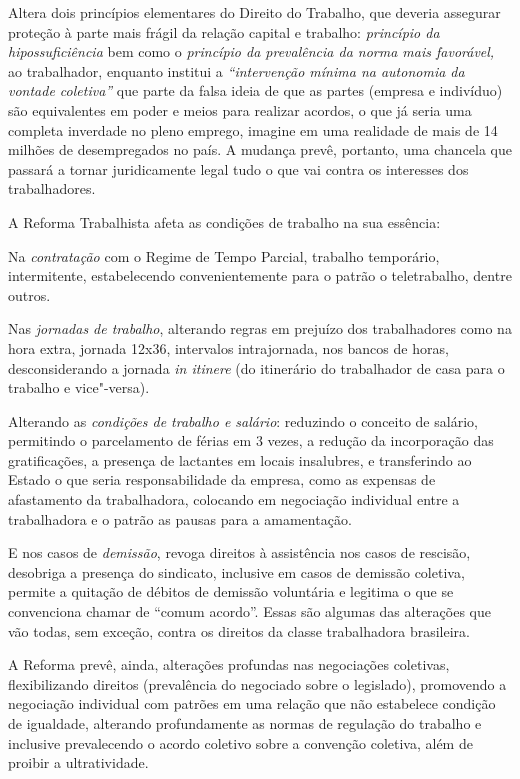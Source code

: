 Altera dois princípios elementares do Direito do Trabalho, que deveria
assegurar proteção à parte mais frágil da relação capital e trabalho:
\emph{princípio da hipossuficiência} bem como o \emph{princípio da
prevalência da norma mais favorável,} ao trabalhador, enquanto institui
a \emph{``intervenção mínima na autonomia da vontade coletiva''} que
parte da falsa ideia de que as partes (empresa e indivíduo) são
equivalentes em poder e meios para realizar acordos, o que já seria uma
completa inverdade no pleno emprego, imagine em uma realidade de mais de
14 milhões de desempregados no país. A mudança prevê, portanto, uma
chancela que passará a tornar juridicamente legal tudo o que vai contra
os interesses dos trabalhadores.

A Reforma Trabalhista afeta as condições de trabalho na sua essência:

Na \emph{contratação} com o Regime de Tempo Parcial, trabalho
temporário, intermitente, estabelecendo convenientemente para o patrão o
teletrabalho, dentre outros.

Nas \emph{jornadas de trabalho}, alterando regras em prejuízo dos
trabalhadores como na hora extra, jornada 12x36, intervalos
intrajornada, nos bancos de horas, desconsiderando a jornada \emph{in
itinere} (do itinerário do trabalhador de casa para o trabalho e
vice"-versa).

Alterando as \emph{condições de trabalho e salário}: reduzindo o
conceito de salário, permitindo o parcelamento de férias em 3 vezes, a
redução da incorporação das gratificações, a presença de lactantes em
locais insalubres, e transferindo ao Estado o que seria responsabilidade
da empresa, como as expensas de afastamento da trabalhadora, colocando em
negociação individual entre a trabalhadora e o patrão as pausas para a
amamentação.

E nos casos de \emph{demissão}, revoga direitos à assistência nos casos
de rescisão, desobriga a presença do sindicato, inclusive em casos de
demissão coletiva, permite a quitação de débitos de demissão voluntária
e legitima o que se convenciona chamar de ``comum acordo''. Essas são
algumas das alterações que vão todas, sem exceção, contra os direitos da
classe trabalhadora brasileira.

A Reforma prevê, ainda, alterações profundas nas negociações coletivas,
flexibilizando direitos (prevalência do negociado sobre o legislado),
promovendo a negociação individual com patrões em uma relação que não
estabelece condição de igualdade, alterando profundamente as normas de
regulação do trabalho e inclusive prevalecendo o acordo coletivo sobre a
convenção coletiva, além de proibir a ultratividade.

